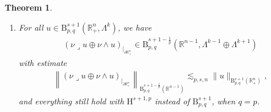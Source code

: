 \documentclass[10pt]{amsart}
\newtheorem{theo}{Theorem}[section]
\theoremstyle{definition}\newtheorem{defi}[theo]{Definition}\newtheorem{rema}[theo]{Remark}\newtheorem{exam}[theo]{Example}\newtheorem{exem}[theo]{Example}\newtheorem{nota}[theo]{Notation}
\newcommand{\bbR}{\mathbb{R}}
\newcommand{\rmH}{\mathrm{H}}%
\newcommand{\rmB}{\mathrm{B}}
\newcommand{\rmd}{\mathrm{d}}
\newcommand{\iprod}{\mathbin{\lrcorner}}
\begin{document}
\begin{theo}
\begin{enumerate}
\begin{align*}
\left\|\nu\iprod u_{|_{\partial\bbR^n_+}} \right\|_{\rmB^{s-\frac{1}{p}}_{p,q}\left(\bbR^{n-1}\right)}\lesssim_{p,s,n} \| u \|_{{\rmB}^{s}_{p,q}\left(\bbR^n_+\right)} + \left\| \delta u \right\|_{{\rmB}^{s}_{p,q}\left(\bbR^n_+\right)} .
\end{align*}
The same results holds with the corresponding estimate, for $u\in {\rmd}^{s}_{p,q}(\rmd,\bbR^{n}_+,\Lambda^k)$ we have a partial trace
\[
\nu\wedge u_{|_{\partial\bbR^n_+}}\in \rmB^{s-\frac{1}{p}}_{p,q}\left(\bbR^{n-1},\Lambda^{k+1}\right)
\]
such that~\eqref{eq:IntegbyPartNormTrace} is satisfied for all $\Psi\in \rmB^{1-s}_{p',q'}(\bbR^n_+, \Lambda^{k+1})$.
\item\label{theoA.1.3} For all $u\in {\rmB}^{s+1}_{p,q}(\bbR^{n}_+,\Lambda^k)$, we have
\begin{align*}
(\nu\iprod u\oplus\nu\wedge u)_{|_{\partial\bbR^n_+}}\in \rmB^{s+1-\frac{1}{p}}_{p,q} \left(\bbR^{n-1},\Lambda^{k-1}\oplus\Lambda^{k+1}\right)
\end{align*}
with estimate
\begin{align*}
\left\| (\nu\iprod u\oplus\nu\wedge u)_{|_{\partial\bbR^n_+}} \right\|_{\rmB^{s+1-\frac{1}{p}}_{p,q}\left(\bbR^{n-1}\right)} \lesssim_{p,s,n} \| u \|_{{\rmB}^{s+1}_{p,q}\left(\bbR^n_+\right)},
\end{align*}
and everything still hold with ${\rmH}^{s+1,p}$ instead of $\rmB^{s+1}_{p,q}$, when $q=p$.
\end{enumerate}
\end{theo}
\end{document}
